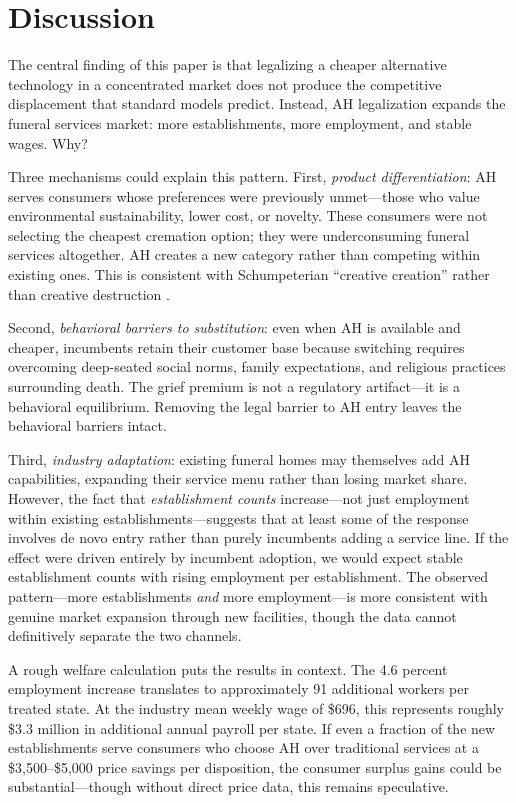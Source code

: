 \documentclass[12pt]{article}
\begin{document}
\section{Discussion}

The central finding of this paper is that legalizing a cheaper alternative technology in a concentrated market does not produce the competitive displacement that standard models predict. Instead, AH legalization expands the funeral services market: more establishments, more employment, and stable wages. Why?

Three mechanisms could explain this pattern. First, \emph{product differentiation}: AH serves consumers whose preferences were previously unmet---those who value environmental sustainability, lower cost, or novelty. These consumers were not selecting the cheapest cremation option; they were underconsuming funeral services altogether. AH creates a new category rather than competing within existing ones. This is consistent with Schumpeterian ``creative creation'' rather than creative destruction \citep{schumpeter1942capitalism}.

Second, \emph{behavioral barriers to substitution}: even when AH is available and cheaper, incumbents retain their customer base because switching requires overcoming deep-seated social norms, family expectations, and religious practices surrounding death. The grief premium is not a regulatory artifact---it is a behavioral equilibrium. Removing the legal barrier to AH entry leaves the behavioral barriers intact.

Third, \emph{industry adaptation}: existing funeral homes may themselves add AH capabilities, expanding their service menu rather than losing market share. However, the fact that \emph{establishment counts} increase---not just employment within existing establishments---suggests that at least some of the response involves de novo entry rather than purely incumbents adding a service line. If the effect were driven entirely by incumbent adoption, we would expect stable establishment counts with rising employment per establishment. The observed pattern---more establishments \emph{and} more employment---is more consistent with genuine market expansion through new facilities, though the data cannot definitively separate the two channels.

A rough welfare calculation puts the results in context. The 4.6 percent employment increase translates to approximately 91 additional workers per treated state. At the industry mean weekly wage of \$696, this represents roughly \$3.3 million in additional annual payroll per state. If even a fraction of the new establishments serve consumers who choose AH over traditional services at a \$3,500--\$5,000 price savings per disposition, the consumer surplus gains could be substantial---though without direct price data, this remains speculative.
\end{document}
